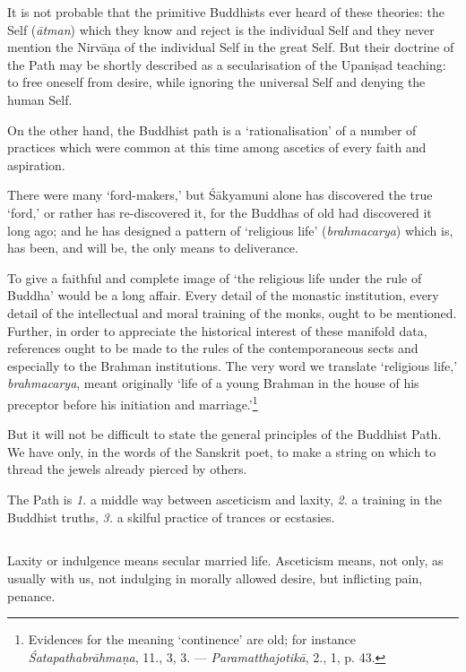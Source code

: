\documentclass[a4paper, 11pt, oneside, english, landscape]{article}
\begin{document}
It is not probable that the primitive Buddhists ever heard of these theories: the Self (\emph{ātman}) which they know and reject is the individual Self and they never mention the Nirvāṇa of the individual Self in the great Self. But their doctrine of the Path may be shortly described as a secularisation of the Upaniṣad teaching: to free oneself from desire, while ignoring the universal Self and denying the human Self.

On the other hand, the Buddhist path is a `rationalisation' of a number of practices which were common at this time among ascetics of every faith and aspiration.

There were many `ford-makers,' but Śākyamuni alone has discovered the true `ford,' or rather has re-discovered it, for the Buddhas of old had discovered it long ago; and he has designed a pattern of `religious life' (\emph{brahmacarya}) which is, has been, and will be, the only means to deliverance.

To give a faithful and complete image of `the religious life under the rule of Buddha' would be a long affair. Every detail of the monastic institution, every detail of the intellectual and moral training of the monks, ought to be mentioned. Further, in order to appreciate the historical interest of these manifold data, references ought to be made to the rules of the contemporaneous sects and especially to the Brahman institutions. The very word we translate `religious life,' \emph{brahmacarya}, meant originally `life of a young Brahman in the house of his preceptor before his initiation and marriage.'\footnote{Evidences for the meaning `continence' are old; for instance \emph{Śatapathabrāhmaṇa}, 11., 3, 3. --- \emph{Paramatthajotikā}, 2., 1, p. 43.}

But it will not be difficult to state the general principles of the Buddhist Path. We have only, in the words of the Sanskrit poet, to make a string on which to thread the jewels already pierced by others.

The Path is \emph{1.} a middle way between asceticism and laxity, \emph{2.} a training in the Buddhist truths, \emph{3.} a skilful practice of trances or ecstasies.

\subsection{}
\paragraph{}
Laxity or indulgence means secular married life. Asceticism means, not only, as usually with us, not indulging in morally allowed desire, but inflicting pain, penance.
\end{document}
